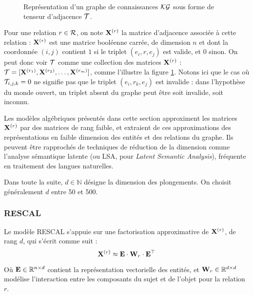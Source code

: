\begin{figure}
    \centering
    
    \caption[Représentation de graphe sous forme de tenseur d'adjacence]{Représentation d'un graphe de connaissances $\KG$ sous forme de tenseur d'adjacence $\cal{T}$.}
    \label{fig:kge-algebric-overview}
\end{figure}

Pour une relation $r \in \Rel$, on note $\bf{X}^{(r)}$ la matrice d'adjacence associée à cette relation : $\bf{X}^{(r)}$ est une matrice booléenne carrée, de dimension $n$ et dont la coordonnée $(i, j)$ contient $1$ si le triplet $(e_i, r, e_j)$ est valide, et $0$ sinon. On peut donc voir $\cal{T}$ comme une collection des matrices $\bf{X}^{(r)}$ : $\cal{T} = [\bf{X}^{(r_1)}, \bf{X}^{(r_2)}, \ldots, \bf{X}^{(r_m)}]$, comme l'illustre la figure  \ref{fig:kge-algebric-overview}. Notons ici que le cas où $\cal{T}_{i, j, k} = 0$ ne signifie pas que le triplet $(e_i, r_k, e_j)$ est invalide : dans l'hypothèse du monde ouvert, un triplet absent du graphe peut être soit invalide, soit inconnu.

Les modèles algébriques présentés dans cette section approximent les matrices $\bf{X}^{(r)}$ par des matrices de rang faible, et extraient de ces approximations des représentations en faible dimension des entités et des relations du graphe. Ils peuvent être rapprochés de techniques de réduction de la dimension comme l'analyse sémantique latente (ou LSA, pour \textit{Latent Semantic Analysis}), fréquente en traitement des langues naturelles.

Dans toute la suite, $d \in \mathbb{N}$ désigne la dimension des plongements. On choisit généralement $d$ entre 50 et 500.

\subsubsection{RESCAL \cite{rescal}}

Le modèle RESCAL \cite{rescal} s'appuie sur une factorisation approximative de $\bf{X}^{(r)}$, de rang $d$, qui s'écrit comme suit  :
\begin{equation}
    \bf{X}^{(r)} \approx \bf{E} \cdot \bf{W}_r \cdot \bf{E}^\top
    \label{eq:kge-rescal-factorization}
\end{equation}

Où $\bf{E} \in \R^{n \times d}$ contient la représentation vectorielle des entités, et $\bf{W}_r \in \R^{d \times d}$ modélise l'interaction entre les composants du sujet et de l'objet pour la relation $r$.

